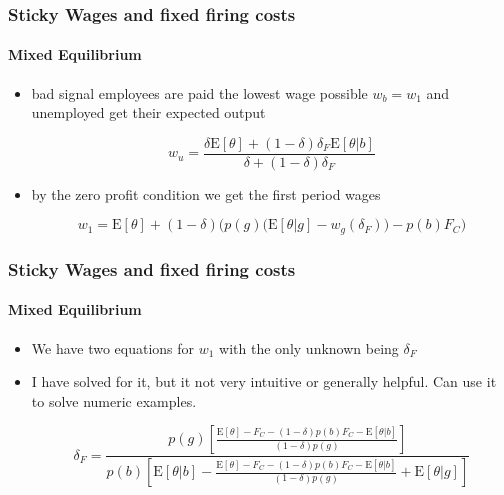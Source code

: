 \documentclass{beamer}
\newcommand{\E}{\mathrm{E}}
\begin{document}
\begin{frame}

\frametitle{Sticky Wages and fixed firing costs}

\framesubtitle{Mixed Equilibrium}

\begin{itemize}
	\setlength{\itemsep}{3mm}

	\item bad signal employees are paid the lowest wage possible $ w_b = w_1$ and unemployed get their expected output 
	
	$$ w_u = \frac{ \delta\E[\theta] + (1-\delta)\delta_F\E[\theta | b]}{  \delta + (1-\delta)\delta_F} $$
	
	\item by the zero profit condition we get the first period wages 
	
	$$w_1 = \E[\theta] + (1-\delta)  \bigg( p(g) \Big(\E[\theta|g] - w_g(\delta_F)  \Big) - p(b)F_C  \bigg) $$
	
\end{itemize}
\end{frame}




\begin{frame}

\frametitle{Sticky Wages and fixed firing costs}

\framesubtitle{Mixed Equilibrium}

\begin{itemize}
	\setlength{\itemsep}{3mm}
	
	\item We have two equations for $w_1$ with the only unknown being $\delta_F$
	
	\item I have solved for it, but it not very intuitive or generally helpful. Can use it to solve numeric examples.
	
	\newcommand{\TA}{\frac{\E[\theta] - F_C - (1-\delta)p(b)F_C - \E[\theta|b]}{(1-\delta)p(g)} + \E[\theta|g]}
	
	\newcommand{\TAMEG}{\frac{\E[\theta] - F_C - (1-\delta)p(b)F_C - \E[\theta|b]}{(1-\delta)p(g)}}
	
	$$ \delta_F = \frac{p(g) \left[\TAMEG \right]}{ p(b) \left[ \E[\theta | b] - \TA \right] } $$
	
\end{itemize}
\end{frame}
\end{document}
